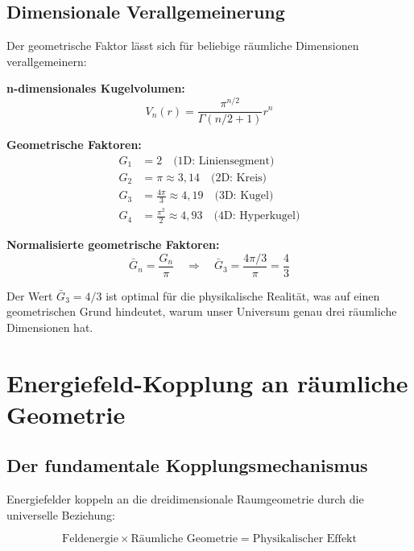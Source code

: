 \documentclass[12pt,a4paper]{report}
\begin{document}
	\subsection{Dimensionale Verallgemeinerung}
	\label{subsec:dimensional_generalization}
	
	Der geometrische Faktor lässt sich für beliebige räumliche Dimensionen verallgemeinern:
	
	\textbf{n-dimensionales Kugelvolumen:}
	\begin{equation}
		V_n(r) = \frac{\pi^{n/2}}{\Gamma(n/2 + 1)} r^n
	\end{equation}
	
	\textbf{Geometrische Faktoren:}
	\begin{align}
		G_1 &= 2 \quad \text{(1D: Liniensegment)} \\
		G_2 &= \pi \approx 3,14 \quad \text{(2D: Kreis)} \\
		G_3 &= \frac{4\pi}{3} \approx 4,19 \quad \text{(3D: Kugel)} \\
		G_4 &= \frac{\pi^2}{2} \approx 4,93 \quad \text{(4D: Hyperkugel)}
	\end{align}
	
	\textbf{Normalisierte geometrische Faktoren:}
	\begin{equation}
		\bar{G}_n = \frac{G_n}{\pi} \quad \Rightarrow \quad \bar{G}_3 = \frac{4\pi/3}{\pi} = \frac{4}{3}
	\end{equation}
	
	Der Wert $\bar{G}_3 = 4/3$ ist optimal für die physikalische Realität, was auf einen geometrischen Grund hindeutet, warum unser Universum genau drei räumliche Dimensionen hat.
	
	\section{Energiefeld-Kopplung an räumliche Geometrie}
	\label{sec:energy_field_coupling}
	
	\subsection{Der fundamentale Kopplungsmechanismus}
	\label{subsec:coupling_mechanism}
	
	Energiefelder koppeln an die dreidimensionale Raumgeometrie durch die universelle Beziehung:
	
	\begin{equation}
		\text{Feldenergie} \times \text{Räumliche Geometrie} = \text{Physikalischer Effekt}
	\end{equation}
	
\end{document}
